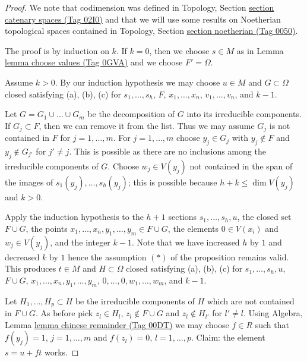 \documentclass{amsart}
\theoremstyle{plain}
\theoremstyle{definition}
\theoremstyle{remark}
\numberwithin{equation}{subsection}
\begin{document}
\begin{proof}
We note that codimension was defined in
Topology, Section \href{https://stacks.math.columbia.edu/tag/02I0}{section catenary spaces (Tag 02I0)}
and that we will use some results on Noetherian topological
spaces contained in
Topology, Section \href{https://stacks.math.columbia.edu/tag/0050}{section noetherian (Tag 0050)}.

\medskip\noindent
The proof is by induction on $k$. If $k = 0$, then we choose
$s \in M$ as in Lemma \href{https://stacks.math.columbia.edu/tag/0GVA}{lemma choose values (Tag 0GVA)} and we choose
$F' = \Omega$.

\medskip\noindent
Assume $k > 0$. By our induction hypothesis we may
choose $u \in M$ and $G \subset \Omega$ closed satisfying
(a), (b), (c) for $s_1, \ldots, s_h$, $F$, $x_1, \ldots, x_n$,
$v_1, \ldots, v_n$, and $k - 1$.

\medskip\noindent
Let $G = G_1 \cup \ldots \cup G_m$ be the decomposition of $G$ into
its irreducible components. If $G_j \subset F$, then we can remove
it from the list. Thus we may assume $G_j$ is not contained in $F$
for $j = 1, \ldots, m$.
For $j = 1, \ldots, m$ choose $y_j \in G_j$ with $y_j \not \in F$
and $y_j \not \in G_{j'}$ for $j' \not = j$. This is possible as
there are no inclusions among the irreducible components of $G$.
Choose $w_j \in V(y_j)$ not contained in the span of the images of
$s_1(y_j), \ldots, s_h(y_j)$; this is possible because
$h + k \leq \dim V(y_j)$ and $k > 0$.

\medskip\noindent
Apply the induction hypothesis to the $h + 1$ sections
$s_1, \ldots, s_h, u$, the closed set $F \cup G$,
the points $x_1, \ldots, x_n, y_1, \ldots, y_m \in F \cup G$,
the elements $0 \in V(x_i)$ and $w_j \in V(y_j)$, and
the integer $k - 1$. Note that we have increased $h$ by $1$ and
decreased $k$ by $1$ hence the assumption $(*)$ of the proposition
remains valid. This produces $t \in M$ and $H \subset \Omega$ closed
satisfying (a), (b), (c) for $s_1, \ldots, s_h, u$, $F \cup G$,
$x_1, \ldots, x_n, y_1, \ldots, y_m$, $0, \ldots, 0, w_1, \ldots, w_m$,
and $k - 1$.

\medskip\noindent
Let $H_1, \ldots, H_p \subset H$ be the irreducible components of $H$
which are not contained in $F \cup G$. As before pick $z_l \in H_l$,
$z_l \not \in F \cup G$ and $z_l \not \in H_{l'}$ for $l' \not = l$.
Using Algebra, Lemma \href{https://stacks.math.columbia.edu/tag/00DT}{lemma chinese remainder (Tag 00DT)}
we may choose $f \in R$ such that
$f(y_j) = 1$, $j = 1, \ldots, m$ and $f(z_l) = 0$, $l = 1, \ldots, p$.
Claim: the element $s = u + f t$ works.


\end{proof}
\end{document}
